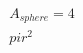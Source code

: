 \documentclass[preview]{standalone}
\begin{document}
\begin{align*}
A_{sphere} = 4 \\pi r^2
\end{align*}
\end{document}
